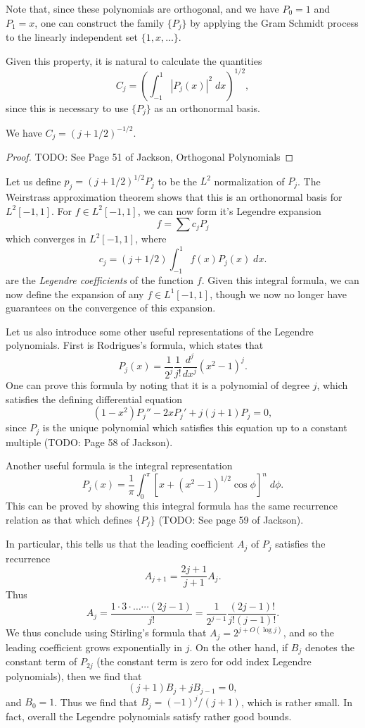 \begin{remark}
    Note that, since these polynomials are orthogonal, and we have $P_0 = 1$ and $P_1 = x$, one can construct the family $\{ P_j \}$ by applying the Gram Schmidt process to the linearly independent set $\{ 1, x, \dots \}$.
\end{remark}

Given this property, it is natural to calculate the quantities
%
\[ C_j = \left( \int_{-1}^1 |P_j(x)|^2\; dx \right)^{1/2}, \]
%
since this is necessary to use $\{ P_j \}$ as an orthonormal basis.

\begin{theorem}
    We have $C_j = (j + 1/2)^{-1/2}$.
\end{theorem}
\begin{proof}
    TODO: See Page 51 of Jackson, Orthogonal Polynomials
\end{proof}

Let us define $p_j = (j + 1/2)^{1/2} P_j$ to be the $L^2$ normalization of $P_j$. The Weirstrass approximation theorem shows that this is an orthonormal basis for $L^2[-1,1]$. For $f \in L^2[-1,1]$, we can now form it's Legendre expansion
%
\[ f = \sum c_j P_j \]
%
which converges in $L^2[-1,1]$, where
%
\[ c_j = (j+1/2) \int_{-1}^1 f(x) P_j(x)\; dx. \]
%
are the \emph{Legendre coefficients} of the function $f$. Given this integral formula, we can now define the expansion of any $f \in L^1[-1,1]$, though we now no longer have guarantees on the convergence of this expansion.

Let us also introduce some other useful representations of the Legendre polynomials. First is Rodrigues's formula, which states that
%
\[ P_j(x) = \frac{1}{2^j} \frac{1}{j!} \frac{d^j}{dx^j} (x^2 - 1)^j. \]
%
One can prove this formula by noting that it is a polynomial of degree $j$, which satisfies the defining differential equation
%
\[ (1 - x^2) P_j'' - 2xP_j' + j(j+1) P_j = 0, \]
%
since $P_j$ is the unique polynomial which satisfies this equation up to a constant multiple (TODO: Page 58 of Jackson).

Another useful formula is the integral representation
%
\[ P_j(x) = \frac{1}{\pi} \int_0^\pi [x + (x^2 - 1)^{1/2} \cos \phi]^n\; d\phi. \]
%
This can be proved by showing this integral formula has the same recurrence relation as that which defines $\{ P_j \}$ (TODO: See page 59 of Jackson).

In particular, this tells us that the leading coefficient $A_j$ of $P_j$ satisfies the recurrence
%
\[ A_{j+1} = \frac{2j+1}{j + 1} A_j. \]
%
Thus
%
\[ A_j = \frac{1 \cdot 3 \cdot \dots \cdots (2j - 1)}{j!} = \frac{1}{2^{j-1}} \frac{(2j-1)!}{j! (j-1)!}. \]
%
We thus conclude using Stirling's formula that $A_j = 2^{j + O(\log j)}$, and so the leading coefficient grows exponentially in $j$. On the other hand, if $B_j$ denotes the constant term of $P_{2j}$ (the constant term is zero for odd index Legendre polynomials), then we find that
%
\[ (j+1) B_j + j B_{j-1} = 0, \]
%
and $B_0 = 1$. Thus we find that $B_j = (-1)^j / (j+1)$, which is rather small. In fact, overall the Legendre polynomials satisfy rather good bounds.

